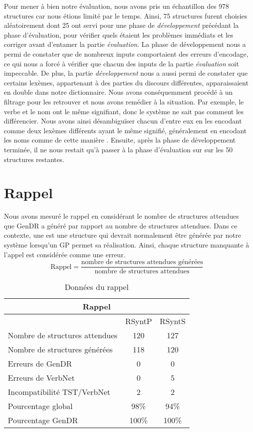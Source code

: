 Pour mener à bien notre évaluation, nous avons pris un échantillon des 978 structures car nous étions limité par le temps. Ainsi, 75 structures furent choisies aléatoirement dont 25 ont servi pour une phase de \emph{développement} précédant la phase d'évaluation, pour vérifier quels étaient les problèmes immédiats et les corriger avant d'entamer la partie \emph{évaluation}. La phase de développement nous a permi de constater que de nombreux inputs comportaient des erreurs d'encodage, ce qui nous a forcé à vérifier que chacun des inputs de la partie \emph{évaluation} soit impeccable. De plus, la partie \emph{développement} nous a aussi permi de constater que certains lexèmes, appartenant à des parties du discours différentes, apparaissaient en double dans notre dictionnaire. Nous avons conséquemment procédé à un filtrage pour les retrouver et nous avons remédier à la situation. Par exemple, le verbe  et le nom  ont le même signifiant, donc le système ne sait pas comment les différencier. Nous avons ainsi désambiguïser chacun d'entre eux en les encodant comme deux lexèmes différents ayant le même signifié, généralement en encodant les noms comme  de cette manière . Ensuite, après la phase de développement terminée, il ne nous restait qu'à passer à la phase d'évaluation sur sur les 50 structures restantes.
                              
\section{Rappel}
Nous avons mesuré le rappel en considérant le nombre de structures attendues que GenDR a généré par rapport au nombre de structures attendues. Dans ce contexte, une  est une structure qui devrait normalement être générée par notre système lorsqu'un \ac{GP} permet sa réalisation. Ainsi, chaque structure manquante à l'appel est considérée comme une erreur.
\[\text{Rappel} = \frac{\text{nombre de structures attendues générées}}{\text{nombre de structures attendues}}\]

\begin{table}
\caption{Données du rappel}
\begin{tabular}{ |p{6cm}||c|c|  }
 \hline
 \multicolumn{3}{|c|}{Rappel} \\
 \hline
  & RSyntP & RSyntS\\
 \hline
 Nombre de structures attendues   & 120  &127  \\
 Nombre de structures générées &  118  & 120   \\
 Erreurs de GenDR & 0 & 0\\
 Erreurs de VerbNet    & 0 & 5\\
 Incompatibilité TST/VerbNet & 2 & 2\\
 Pourcentage global & 98\%  & 94\% \\
 Pourcentage GenDR & 100\%  & 100\% \\
 \hline
\end{tabular}
\end{table}

